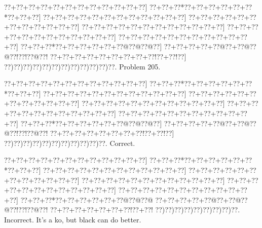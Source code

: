 \documentclass[a5paper]{article}
\begin{document}
\begin{center}
{\goo
\0??+\0??+\0??+\0??+\0??+\0??+\0??+\0??+\0??+\0??+\0??+\0??]
\0??+\0??+\0??*\0??+\0??+\0??+\0??+\0??+\0??*\0??+\0??+\0??]
\0??+\0??+\0??+\0??+\0??+\0??+\0??+\0??+\0??+\0??+\0??+\0??]
\0??+\0??+\0??+\0??+\0??+\0??+\0??+\0??+\0??+\0??+\0??+\0??]
\0??+\0??+\0??+\0??+\0??+\0??+\0??+\0??+\0??+\0??+\0??+\0??]
\0??+\0??+\0??+\0??+\0??+\0??+\0??+\0??+\0??+\0??+\0??+\0??]
\0??+\0??+\0??+\0??+\0??+\0??+\0??+\0??+\0??+\0??+\0??+\0??]
\0??+\0??+\0??*\0??+\0??+\0??+\0??+\0??+\0??@\0??@\0??@\0??]
\0??+\0??+\0??+\0??+\0??@\0??+\0??@\0??@\0??!\0??!\0??@\0??!
\0??+\0??+\0??+\0??+\0??+\0??+\0??+\0??+\0??!\0??+\0??!\0??]
\0??)\0??)\0??)\0??)\0??)\0??)\0??)\0??)\0??)\0??)\0??)\0??.
}
Problem 205.

\end{center}
\begin{center}
{\goo
\0??+\0??+\0??+\0??+\0??+\0??+\0??+\0??+\0??+\0??+\0??+\0??]
\0??+\0??+\0??*\0??+\0??+\0??+\0??+\0??+\0??*\0??+\0??+\0??]
\0??+\0??+\0??+\0??+\0??+\0??+\0??+\0??+\0??+\0??+\0??+\0??]
\0??+\0??+\0??+\0??+\0??+\0??+\0??+\0??+\0??+\0??+\0??+\0??]
\0??+\0??+\0??+\0??+\0??+\0??+\0??+\0??+\0??+\0??+\0??+\0??]
\0??+\0??+\0??+\0??+\0??+\0??+\0??+\0??+\0??+\0??+\0??+\0??]
\0??+\0??+\0??+\0??+\0??+\0??+\0??+\0??+\0??+\0??+\0??+\0??]
\0??+\0??+\0??*\0??+\0??+\0??+\0??+\0??+\0??@\0??@\0??@\0??]
\0??+\0??+\0??+\0??+\0??@\0??+\0??@\0??@\0??!\0??!\0??@\0??!
\0??+\0??+\0??+\0??+\0??+\0??+\0??+\0??!\0??+\0??!\0??]
\0??)\0??)\0??)\0??)\0??)\0??)\0??)\0??)\0??)\0??)\0??.
}
Correct. 

\end{center}
\begin{center}
{\goo
\0??+\0??+\0??+\0??+\0??+\0??+\0??+\0??+\0??+\0??+\0??+\0??]
\0??+\0??+\0??*\0??+\0??+\0??+\0??+\0??+\0??*\0??+\0??+\0??]
\0??+\0??+\0??+\0??+\0??+\0??+\0??+\0??+\0??+\0??+\0??+\0??]
\0??+\0??+\0??+\0??+\0??+\0??+\0??+\0??+\0??+\0??+\0??+\0??]
\0??+\0??+\0??+\0??+\0??+\0??+\0??+\0??+\0??+\0??+\0??+\0??]
\0??+\0??+\0??+\0??+\0??+\0??+\0??+\0??+\0??+\0??+\0??+\0??]
\0??+\0??+\0??+\0??+\0??+\0??+\0??+\0??+\0??+\0??+\0??+\0??]
\0??+\0??+\0??*\0??+\0??+\0??+\0??+\0??+\0??@\0??@\0??@
\0??+\0??+\0??+\0??+\0??@\0??+\0??@\0??@\0??!\0??!\0??@\0??!
\0??+\0??+\0??+\0??+\0??+\0??+\0??!\0??+\0??!
\0??)\0??)\0??)\0??)\0??)\0??)\0??)\0??)\0??.
}
Incorrect. It's a ko, but black can do better. 

\end{center}
\end{document}
